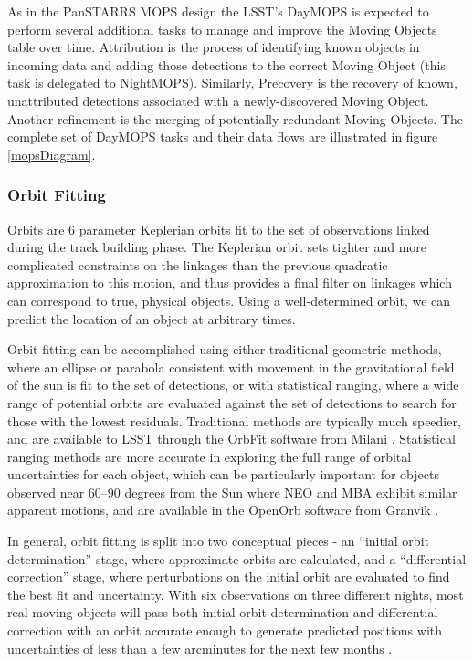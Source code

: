 \documentclass[12pt,preprint]{aastex}
\begin{document}
As in the PanSTARRS MOPS design \citep{psMOPSDesign} the LSST's
DayMOPS is expected to perform several additional tasks to manage and
improve the Moving Objects table over time.  Attribution is the
process of identifying known objects in incoming data and adding those
detections to the correct Moving Object (this task is delegated to
NightMOPS). Similarly, Precovery is the recovery of known,
unattributed detections associated with a newly-discovered Moving
Object.  Another refinement is the merging of potentially redundant
Moving Objects.  The complete set of DayMOPS tasks and their data
flows are illustrated in figure \ref{mopsDiagram}.





\subsubsection{Orbit Fitting}
\label{orbitFitting}

Orbits are 6 parameter Keplerian orbits fit to the set of observations
linked during the track building phase. The Keplerian orbit sets
tighter and more complicated constraints on the linkages than the
previous quadratic approximation to this motion, and thus provides a
final filter on linkages which can correspond to true, physical
objects. Using a well-determined orbit, we can predict the location of
an object at arbitrary times.

Orbit fitting can be accomplished using either traditional geometric
methods, where an ellipse or parabola consistent with movement in the
gravitational field of the sun is fit to the set of detections, or
with statistical ranging, where a wide range of potential orbits are
evaluated against the set of detections to search for those with
the lowest residuals. Traditional methods are typically much speedier,
and are available to LSST through the OrbFit software from Milani
\citep{Milani2006}. Statistical ranging methods are more accurate in
exploring the full range of orbital uncertainties for each object,
which can be particularly important for objects observed near 60--90
degrees from the Sun where NEO and MBA exhibit similar apparent
motions, and are available in the OpenOrb software from Granvik
\citep{OpenOrb2009}.

In general, orbit fitting is split into two conceptual pieces - an
``initial orbit determination'' stage, where approximate orbits are
calculated, and a ``differential correction'' stage, where
perturbations on the initial orbit are evaluated to find the best fit
and uncertainty. With six observations on three different nights, most
real moving objects will pass both initial orbit determination and
differential correction with an orbit accurate enough to generate
predicted positions with uncertainties of less than a few arcminutes
for the next few months \citep{basicSolarSystem}.
\end{document}
